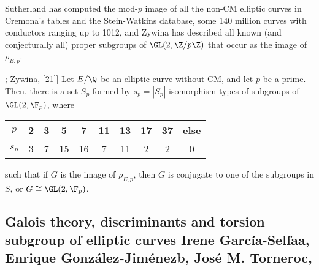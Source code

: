


Sutherland has computed the mod-$p$ image of all the non-CM elliptic curves in Cremona’s tables and the Stein-Watkins database, some 140 million curves with conductors ranging up to 1012, and Zywina has described all known (and conjecturally all) proper subgroups of $\GL(2,\Z/p\Z)$ that occur as the image of $\rho_{E,p}$.


\begin{conj}[Sutherland, [20]; Zywina, [21]]
Let $E/\Q$ be an elliptic curve without CM, and let $p$ be a prime. Then, there is a set $S_p$ formed by $s_p= |S_p|$ isomorphism types of subgroups of $\GL(2,\F_p)$, where
	\begin{table}[!ht]
	\centering
	\begin{tabular}{c|ccccccccc}
	$p$ & 2 & 3 & 5 & 7 & 11 & 13 & 17 & 37 & else \\ \hline 
	$s_p$ & 3 & 7 & 15 & 16 & 7 & 11 & 2 & 2 & 0 
	\end{tabular}
	\end{table}
such that if $G$ is the image of $\rho_{E,p}$, then $G$ is conjugate to one of the subgroups in $S$, or $G \cong \GL(2,\F_p)$. 
\end{conj}



\subsection{Galois theory, discriminants and torsion subgroup of elliptic curves Irene García-Selfaa, Enrique González-Jiménezb, José M. Torneroc,}


